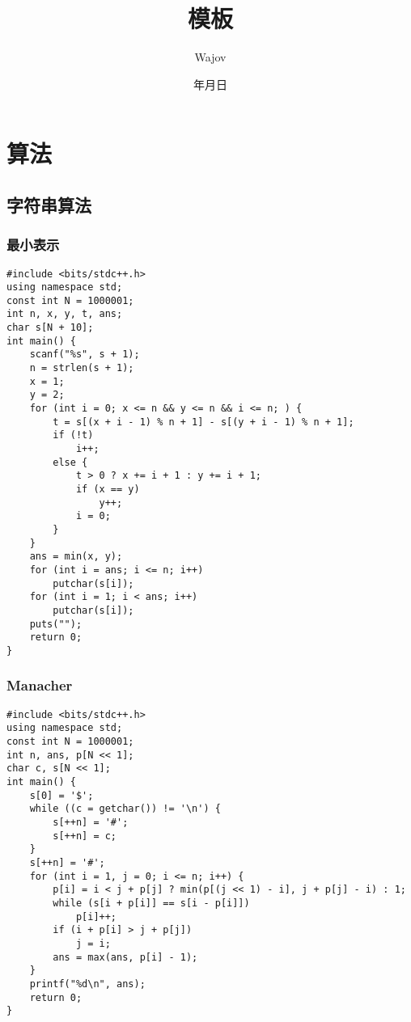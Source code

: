 ﻿\documentclass[a4paper]{article}
\begin{document}
\title{模板}
\author{Wajov}
\date{\number\year 年\number\month 月\number\day 日}
\renewcommand{\contentsname}{目录}
\maketitle
{}
\tableofcontents
\newpage
{}
\newfontfamily{}
\section{算法}
\subsection{字符串算法}
\subsubsection{最小表示}
\begin{lstlisting}
#include <bits/stdc++.h>
using namespace std;
const int N = 1000001;
int n, x, y, t, ans;
char s[N + 10];
int main() {
    scanf("%s", s + 1);
    n = strlen(s + 1);
    x = 1;
    y = 2;
    for (int i = 0; x <= n && y <= n && i <= n; ) {
        t = s[(x + i - 1) % n + 1] - s[(y + i - 1) % n + 1];
        if (!t)
            i++;
        else {
            t > 0 ? x += i + 1 : y += i + 1;
            if (x == y)
                y++;
            i = 0;
        }
    }
    ans = min(x, y);
    for (int i = ans; i <= n; i++)
        putchar(s[i]);
    for (int i = 1; i < ans; i++)
        putchar(s[i]);
    puts("");
    return 0;
}
\end{lstlisting}
\subsubsection{Manacher}
\begin{lstlisting}
#include <bits/stdc++.h>
using namespace std;
const int N = 1000001;
int n, ans, p[N << 1];
char c, s[N << 1];
int main() {
    s[0] = '$';
    while ((c = getchar()) != '\n') {
        s[++n] = '#';
        s[++n] = c;
    }
    s[++n] = '#';
    for (int i = 1, j = 0; i <= n; i++) {
        p[i] = i < j + p[j] ? min(p[(j << 1) - i], j + p[j] - i) : 1;
        while (s[i + p[i]] == s[i - p[i]])
            p[i]++;
        if (i + p[i] > j + p[j])
            j = i;
        ans = max(ans, p[i] - 1);
    }
    printf("%d\n", ans);
    return 0;
}
\end{lstlisting}
\end{document}
